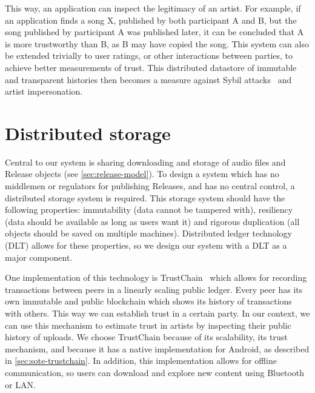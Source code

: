 This way, an application can inspect the legitimacy of an artist. For example, if an application finds a song X, published by both participant A and B, but the song published by participant A was published later, it can be concluded that A is more trustworthy than B, as B may have copied the song. This system can also be extended trivially to user ratings, or other interactions between parties, to achieve better measurements of trust. This distributed datastore of immutable and transparent histories then becomes a measure against Sybil attacks~\citep{douceur2002sybil} and artist impersonation.

\section{Distributed storage}
\label{sec:distributed-storage}
Central to our system is sharing downloading and storage of audio files and Release objects (see \ref{sec:release-model}). To design a system which has no middlemen or regulators for publishing Releases, and has no central control, a distributed storage system is required. This storage system should have the following properties: immutability (data cannot be tampered with), resiliency (data should be available as long as users want it) and rigorous duplication (all objects should be saved on multiple machines). Distributed ledger technology (DLT) allows for these properties, so we design our system with a DLT as a major component.

One implementation of this technology is TrustChain~\citep{otte2017trustchain} which allows for recording transactions between peers in a linearly scaling public ledger. Every peer has its own immutable and public blockchain which shows its history of transactions with others. This way we can establish trust in a certain party. In our context, we can use this mechanism to estimate trust in artists by inspecting their public history of uploads. We choose TrustChain because of its scalability, its trust mechanism, and because it has a native implementation for Android, as described in \ref{sec:sote-trustchain}. In addition, this implementation allows for offline communication, so users can download and explore new content using Bluetooth or LAN.

